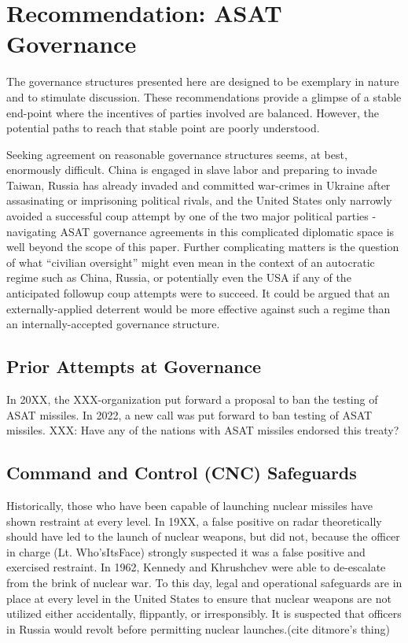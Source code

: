 \section{Recommendation: ASAT Governance}

The governance structures presented here are designed to be exemplary
in nature and to stimulate discussion.  These recommendations provide
a glimpse of a stable end-point where the incentives of parties
involved are balanced.  However, the potential paths to reach that
stable point are poorly understood.

Seeking agreement on reasonable governance structures seems, at best,
enormously difficult.  China is engaged in slave labor and preparing
to invade Taiwan, Russia has already invaded and committed war-crimes
in Ukraine after assasinating or imprisoning political rivals, and the
United States only narrowly avoided a successful coup attempt by one
of the two major political parties - navigating ASAT governance
agreements in this complicated diplomatic space is well beyond the
scope of this paper.  Further complicating matters is the question of
what ``civilian oversight'' might even mean in the context of an
autocratic regime such as China, Russia, or potentially even the USA
if any of the anticipated followup coup attempts were to succeed.  It
could be argued that an externally-applied deterrent would be more
effective against such a regime than an internally-accepted governance
structure.

\subsection{Prior Attempts at Governance}
In 20XX, the XXX-organization put forward a proposal to ban the testing of ASAT missiles.
In 2022, a new call was put forward to ban testing of ASAT missiles.
XXX: Have any of the nations with ASAT missiles endorsed this treaty?


\subsection{Command and Control (CNC) Safeguards}
Historically, those who have been capable of launching nuclear missiles have shown restraint at every level.  In 19XX, a false positive on radar theoretically should have led to the launch of nuclear weapons, but did not, because the officer in charge (Lt. Who'sItsFace) strongly suspected it was a false positive and exercised restraint.  In 1962, Kennedy and Khrushchev were able to de-escalate from the brink of nuclear war.  To this day, legal and operational safeguards are in place at every level in the United States to ensure that nuclear weapons are not utilized either accidentally, flippantly, or irresponsibly.  It is suspected that officers in Russia would revolt before permitting nuclear launches.(cite ditmore's thing)

